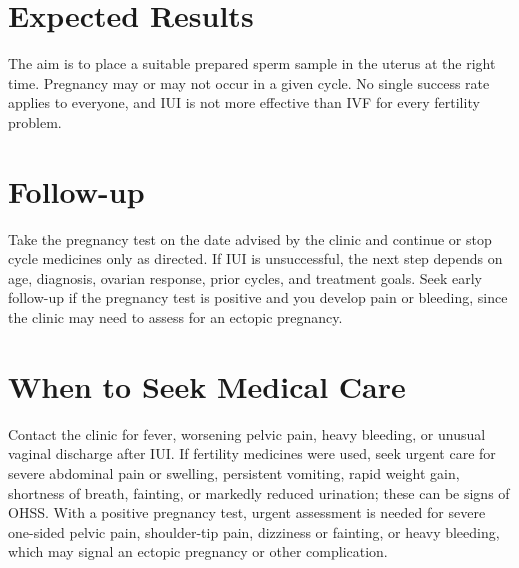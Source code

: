 \section*{Expected Results}
The aim is to place a suitable prepared sperm sample in the uterus at the right time. Pregnancy may or may not occur in a given cycle. No single success rate applies to everyone, and IUI is not more effective than IVF for every fertility problem.

\section*{Follow-up}
Take the pregnancy test on the date advised by the clinic and continue or stop cycle medicines only as directed. If IUI is unsuccessful, the next step depends on age, diagnosis, ovarian response, prior cycles, and treatment goals. Seek early follow-up if the pregnancy test is positive and you develop pain or bleeding, since the clinic may need to assess for an ectopic pregnancy.

\section*{When to Seek Medical Care}
Contact the clinic for fever, worsening pelvic pain, heavy bleeding, or unusual vaginal discharge after IUI. If fertility medicines were used, seek urgent care for severe abdominal pain or swelling, persistent vomiting, rapid weight gain, shortness of breath, fainting, or markedly reduced urination; these can be signs of OHSS. With a positive pregnancy test, urgent assessment is needed for severe one-sided pelvic pain, shoulder-tip pain, dizziness or fainting, or heavy bleeding, which may signal an ectopic pregnancy or other complication.

